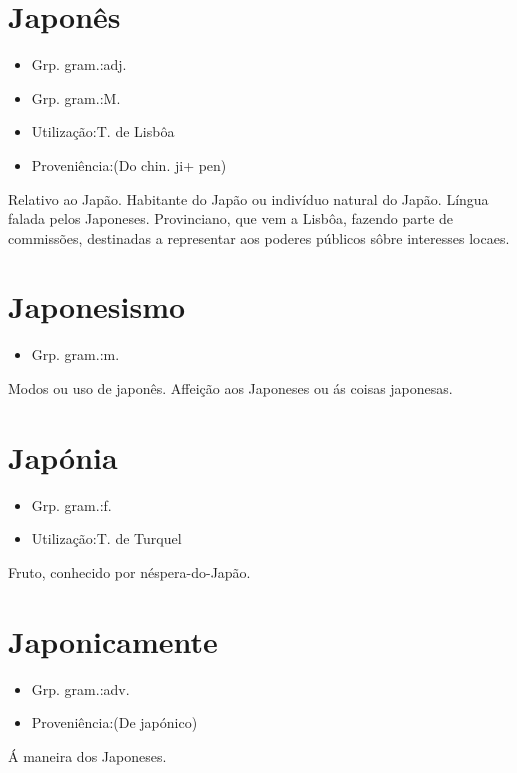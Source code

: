\documentclass{article}
\begin{document}
\section{Japonês}
\begin{itemize}
\item {Grp. gram.:adj.}
\end{itemize}
\begin{itemize}
\item {Grp. gram.:M.}
\end{itemize}
\begin{itemize}
\item {Utilização:T. de Lisbôa}
\end{itemize}
\begin{itemize}
\item {Proveniência:(Do chin. \textunderscore ji\textunderscore  + \textunderscore pen\textunderscore )}
\end{itemize}
Relativo ao Japão.
Habitante do Japão ou indivíduo natural do Japão.
Língua falada pelos Japoneses.
Provinciano, que vem a Lisbôa, fazendo parte de commissões, destinadas a representar aos poderes públicos sôbre interesses locaes.
\section{Japonesismo}
\begin{itemize}
\item {Grp. gram.:m.}
\end{itemize}
Modos ou uso de japonês.
Affeição aos Japoneses ou ás coisas japonesas.
\section{Japónia}
\begin{itemize}
\item {Grp. gram.:f.}
\end{itemize}
\begin{itemize}
\item {Utilização:T. de Turquel}
\end{itemize}
Fruto, conhecido por néspera-do-Japão.
\section{Japonicamente}
\begin{itemize}
\item {Grp. gram.:adv.}
\end{itemize}
\begin{itemize}
\item {Proveniência:(De \textunderscore japónico\textunderscore )}
\end{itemize}
Á maneira dos Japoneses.
\end{document}
